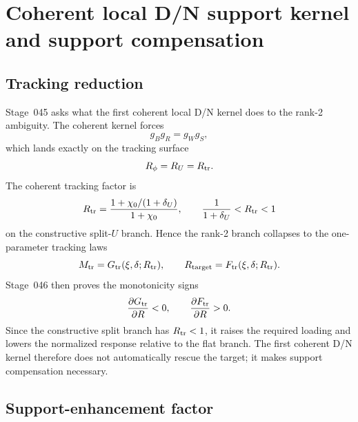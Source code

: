 \section{Coherent local D/N support kernel and support compensation}
\label{sec:part03_support_family1:coherent-local-d-n-support-kernel}

\subsection{Tracking reduction}
\label{subsec:part03-tracking-reduction}

Stage~045 asks what the first coherent local D/N kernel does to the rank-2 ambiguity.  The coherent kernel forces
\begin{equation}
\label{eq:part03-coherent-condition}
g_Bg_R=g_Wg_S,
\end{equation}
which lands exactly on the tracking surface
\begin{equation}
\label{eq:part03-tracking-surface}
R_\phi=R_U=R_{\rm tr}.
\end{equation}
The coherent tracking factor is
\begin{equation}
\label{eq:part03-Rtr}
R_{\rm tr}=\frac{1+\chi_0/(1+\delta_U)}{1+\chi_0},
\qquad
\frac{1}{1+\delta_U}<R_{\rm tr}<1
\end{equation}
on the constructive split-\(U\) branch.  Hence the rank-2 branch collapses to the one-parameter tracking laws
\begin{equation}
\label{eq:part03-tracking-laws}
M_{\rm tr}=G_{\rm tr}(\xi,
\delta;R_{\rm tr}),
\qquad
R_{\rm target}=F_{\rm tr}(\xi,
\delta;R_{\rm tr}).
\end{equation}
Stage~046 then proves the monotonicity signs
\begin{equation}
\label{eq:part03-tracking-monotonicity}
\frac{\partial G_{\rm tr}}{\partial R}<0,
\qquad
\frac{\partial F_{\rm tr}}{\partial R}>0.
\end{equation}
Since the constructive split branch has \(R_{\rm tr}<1\), it raises the required loading and lowers the normalized response relative to the flat branch.  The first coherent D/N kernel therefore does not automatically rescue the target; it makes support compensation necessary.

\subsection{Support-enhancement factor}
\label{subsec:part03-support-enhancement}

